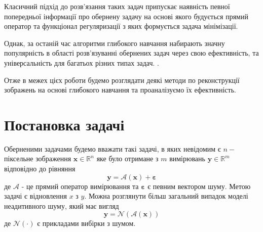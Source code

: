 \documentclass[14pt,a4paper]{extarticle}
\newcounter{e}
\numberwithin{equation}{section}
\numberwithin{figure}{section}
\begin{document}
	Класичний підхід до розв'язання таких задач припускає наявність певної попередньої інформації про обернену задачу на основі якого будується прямий оператор та функціонал регуляризації з яких формується задача мінімізації.
		
	Однак, за останій час алгоритми глибокого навчання набирають значну популярність в області розв'язуванні обернених задач через свою ефективність, та універсальність для багатьох різних типах задач. \cite{ongie2020deep}. 
	
	Отже в межех цієх роботи будемо розглядати деякі методи по реконструкції зображень на основі глибокого навчання та проаналізуємо їх ефективність.
	
	\newpage
	\thispagestyle{empty}
	\section{Постановка задачі} 
	
	

	
	
	
	
	Оберненими задачами будемо вважати такі задачі, в яких невідомим є $n-$ піксельне зображення $\boldsymbol{x} \in \mathbb{R}^{n}$ яке було отримане з $m$ вимірювань $\boldsymbol{y} \in \mathbb{R}^{m}$ відповідно до рівняння
	\begin{equation}
	\label{forward-problem}
	\boldsymbol{y}=\mathcal{A}\left(\boldsymbol{x}\right)+\boldsymbol{\varepsilon}
	\end{equation}
	де $\mathcal{A}$ - це прямий оператор вимірювання та $\boldsymbol{\varepsilon}$ є певним вектором шуму. Метою задачі є відновлення $x$ з $y$. Можна розглянути більш загальний випадок моделі неадитивного шуму, який має вигляд 
	\begin{equation}
	\label{forward-problem-non-additive}
	\boldsymbol{y}=\mathcal{N}\left(\mathcal{A}\left(\boldsymbol{x}\right)\right)
	\end{equation}
	де $\mathcal{N}(\cdot)$ є прикладами вибірки з шумом.
\end{document}
